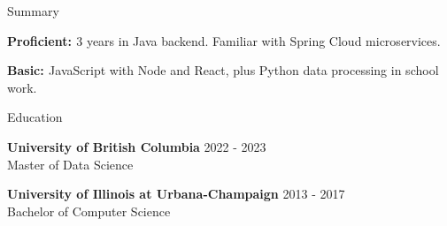 \documentclass{resume} %
\begin{document}
\begin{skillSection}{Summary}
\item {\bf{Proficient: }}3 years in Java backend. Familiar with Spring Cloud microservices.
\item {\bf{Basic: }}JavaScript with Node and React, plus Python data processing in school work.
\end{skillSection}


\begin{rSection}{Education}

{\bf University of British Columbia} \hfill {2022 - 2023}
\\ Master of Data Science

{\bf University of Illinois at Urbana-Champaign} \hfill {2013 - 2017}
\\ Bachelor of Computer Science

\end{rSection}

\end{document}
